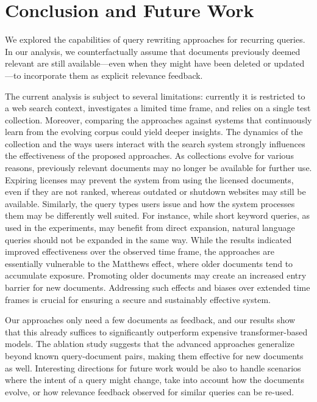 \section{Conclusion and Future Work}
We explored the capabilities of query rewriting approaches for recurring queries. In our analysis, we counterfactually assume that documents previously deemed relevant are still available---even when they might have been deleted or updated---to incorporate them as explicit relevance feedback. 

The current analysis is subject to several limitations: currently it is restricted to a web search context, investigates a limited time frame, and relies on a single test collection. Moreover, comparing the approaches against systems that continuously learn from the evolving corpus could yield deeper insights. The dynamics of the collection and the ways users interact with the search system strongly influences the effectiveness of the proposed approaches. As collections evolve for various reasons, previously relevant documents may no longer be available for further use. Expiring licenses may prevent the system from using the licensed documents, even if they are not ranked, whereas outdated or shutdown websites may still be available. Similarly, the query types users issue and how the system processes them may be differently well suited. For instance, while short keyword queries, as used in the experiments, may benefit from direct expansion, natural language queries should not be expanded in the same way. While the results indicated improved effectiveness over the observed time frame, the approaches are essentially vulnerable to the Matthews effect, where older documents tend to accumulate exposure. Promoting older documents may create an increased entry barrier for new documents. Addressing such effects and biases over extended time frames is crucial for ensuring a secure and sustainably effective system. 

Our approaches only need a few documents as feedback, and our results show that this already suffices to significantly outperform expensive transformer-based models. The ablation study suggests that the advanced approaches generalize beyond known query-document pairs, making them effective for new documents as well. Interesting directions for future work would be also to handle scenarios where the intent of a query might change, take into account how the documents evolve, or how relevance feedback observed for similar queries can be re-used.

